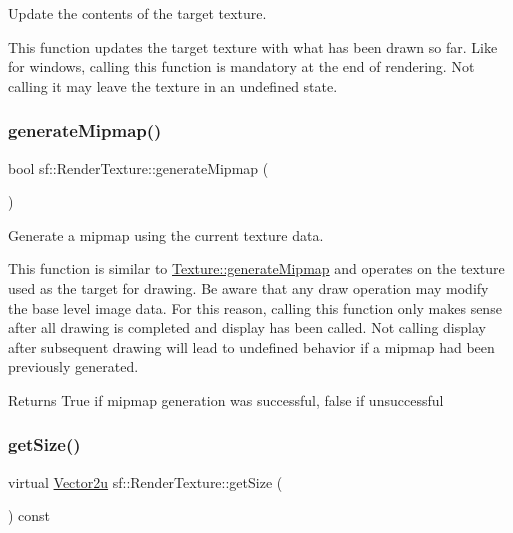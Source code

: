 Update the contents of the target texture. 

This function updates the target texture with what has been drawn so far. Like for windows, calling this function is mandatory at the end of rendering. Not calling it may leave the texture in an undefined state. \mbox{\label{classsf_1_1_render_texture_a8ca34c8b7e00793c1d3ef4f9a834f8cc}} 
\subsubsection{\texorpdfstring{generate\+Mipmap()}{generateMipmap()}}
{\footnotesize\ttfamily bool sf\+::\+Render\+Texture\+::generate\+Mipmap (\begin{DoxyParamCaption}{ }\end{DoxyParamCaption})}



Generate a mipmap using the current texture data. 

This function is similar to \hyperlink{classsf_1_1_texture_a7779a75c0324b5faff77602f871710a9}{Texture\+::generate\+Mipmap} and operates on the texture used as the target for drawing. Be aware that any draw operation may modify the base level image data. For this reason, calling this function only makes sense after all drawing is completed and display has been called. Not calling display after subsequent drawing will lead to undefined behavior if a mipmap had been previously generated.

\begin{DoxyReturn}{Returns}
True if mipmap generation was successful, false if unsuccessful 
\end{DoxyReturn}
\mbox{\label{classsf_1_1_render_texture_a6685315b5c4c25a5dcb75b4280b381ba}} 
\subsubsection{\texorpdfstring{get\+Size()}{getSize()}}
{\footnotesize\ttfamily virtual \hyperlink{classsf_1_1_vector2}{Vector2u} sf\+::\+Render\+Texture\+::get\+Size (\begin{DoxyParamCaption}{ }\end{DoxyParamCaption}) const\hspace{0.3cm}{\ttfamily [virtual]}}



